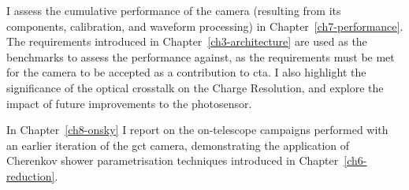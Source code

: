 I assess the cumulative performance of the camera (resulting from its components, calibration, and waveform processing) in Chapter~\ref{ch7-performance}. The requirements introduced in Chapter~\ref{ch3-architecture} are used as the benchmarks to assess the performance against, as the requirements must be met for the camera to be accepted as a contribution to \gls{cta}. I also highlight the significance of the optical crosstalk on the Charge Resolution, and explore the impact of future improvements to the photosensor.

In Chapter~\ref{ch8-onsky} I report on the on-telescope campaigns performed with an earlier iteration of the \gls{gct} camera, demonstrating the application of Cherenkov shower parametrisation techniques introduced in Chapter~\ref{ch6-reduction}.
